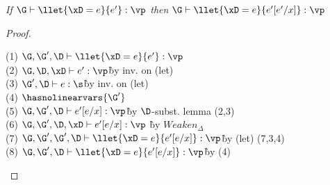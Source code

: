 \begin{lemma}
    \emph{If $\G \vdash \llet{\xD = e}{e'} : \vp$ then $\G \vdash \llet{\xD = e}{e'[e'/x]} : \vp$}
\end{lemma}

\begin{proof}~

\begin{tabbing}
    (1) $\G,\G',\D \vdash \llet{\xD = e}{e'} : \vp$\\
    (2) $\G,\D,\xD \vdash e' : \vp$\` by inv. on (let)\\
    (3) $\G',\D \vdash e : \s$\` by inv. on (let)\\
    (4) $\hasnolinearvars{\G'}$\\
    (5) $\G,\G',\D\vdash e'[e/x] : \vp$\` by $\D$-subst. lemma (2,3)\\
    (6) $\G,\G',\D,\xD \vdash e'[e/x] : \vp$ \` by $Weaken_\Delta$\\
    (7) $\G,\G',\G',\D \vdash \llet{\xD = e}{e'[e/x]} : \vp$\` by (let) (7,3,4)\\
    (8) $\G,\G',\D \vdash \llet{\xD = e}{e'[e/x]} : \vp$\` by (4)\\
\end{tabbing}
\end{proof}

